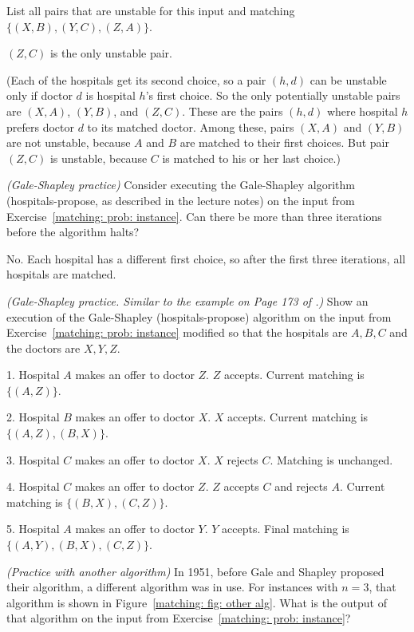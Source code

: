 \documentclass[11pt]{article}
\begin{document}
List all pairs that are unstable for this input and matching  $\{(X, B), (Y, C), (Z, A)\}$.

\solution
$(Z, C)$ is the only unstable pair.

(Each of the hospitals get its second choice,
so a pair $(h, d)$ can be unstable only if doctor $d$ is hospital $h$'s first choice.
So the only potentially unstable pairs are $(X, A)$, $(Y, B)$, and $(Z, C)$.
These are the pairs $(h, d)$ where hospital $h$ prefers doctor $d$ to its matched doctor.
Among these,
pairs $(X, A)$ and $(Y, B)$ are not unstable, because $A$ and $B$ are matched to their first choices.
But pair $(Z, C)$ is unstable, because $C$ is matched to his or her last choice.)

\exercise \emph{(Gale-Shapley practice)}
Consider executing the Gale-Shapley algorithm (hospitals-propose, as described in the lecture notes)
on the input from Exercise~\ref{matching: prob: instance}.
Can there be more than three iterations before the algorithm halts?

\solution
No.  Each hospital has a different first choice,
so after the first three iterations,
all hospitals are matched.

\exercise
\emph{(Gale-Shapley practice. Similar to the example on Page 173 of \JEGreedy.)}
Show an execution of the Gale-Shapley (hospitals-propose) algorithm 
on the input from Exercise~\ref{matching: prob: instance}
modified so that the hospitals are $A, B, C$ and the doctors are $X, Y, Z$.

\solution

1. Hospital $A$ makes an offer to doctor $Z$.  $Z$ accepts.  Current matching is $\{(A, Z)\}$.

2. Hospital $B$ makes an offer to doctor $X$.  $X$ accepts.  Current matching is $\{(A, Z), (B, X)\}$.

3. Hospital $C$ makes an offer to doctor $X$.  $X$ rejects $C$.  Matching is unchanged.

4. Hospital $C$ makes an offer to doctor $Z$.  $Z$ accepts $C$ and rejects $A$.  Current matching is $\{(B, X), (C, Z)\}$.

5. Hospital $A$ makes an offer to doctor $Y$.  $Y$ accepts.  Final matching is  $\{(A, Y), (B, X), (C, Z)\}$.

\exercise\label{matching: prob: before gale shapley}\emph{(Practice with another algorithm)}
In 1951, before Gale and Shapley proposed their algorithm, a different algorithm was in use.  
For instances with $n=3$, that algorithm is shown in Figure~\ref{matching: fig: other alg}.
What is the output of that algorithm on the input from Exercise~\ref{matching: prob: instance}?
\end{document}
